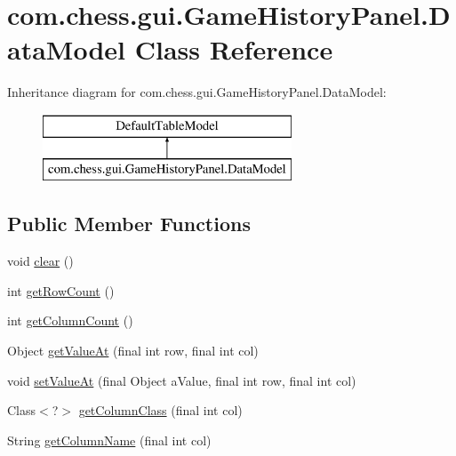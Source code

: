 \hypertarget{classcom_1_1chess_1_1gui_1_1_game_history_panel_1_1_data_model}{}\section{com.\+chess.\+gui.\+Game\+History\+Panel.\+Data\+Model Class Reference}
\label{classcom_1_1chess_1_1gui_1_1_game_history_panel_1_1_data_model}
Inheritance diagram for com.\+chess.\+gui.\+Game\+History\+Panel.\+Data\+Model\+:\begin{figure}[H]
\begin{center}
\leavevmode
\includegraphics[height=2.000000cm]{classcom_1_1chess_1_1gui_1_1_game_history_panel_1_1_data_model}
\end{center}
\end{figure}
\subsection*{Public Member Functions}
\begin{DoxyCompactItemize}
\item 
void \mbox{\hyperlink{classcom_1_1chess_1_1gui_1_1_game_history_panel_1_1_data_model_a0a5d340a3676ce28b6bd47328819e237}{clear}} ()
\item 
int \mbox{\hyperlink{classcom_1_1chess_1_1gui_1_1_game_history_panel_1_1_data_model_aef3c9c2d3e2e4937597665855ee927aa}{get\+Row\+Count}} ()
\item 
int \mbox{\hyperlink{classcom_1_1chess_1_1gui_1_1_game_history_panel_1_1_data_model_a73eb8eabe35891858fea1e6d5aeeaf81}{get\+Column\+Count}} ()
\item 
Object \mbox{\hyperlink{classcom_1_1chess_1_1gui_1_1_game_history_panel_1_1_data_model_a32d5e4b1e8afb0ad7d55650b27b4524d}{get\+Value\+At}} (final int row, final int col)
\item 
void \mbox{\hyperlink{classcom_1_1chess_1_1gui_1_1_game_history_panel_1_1_data_model_a8280ab4c921fb8d1534fde3fac479e2f}{set\+Value\+At}} (final Object a\+Value, final int row, final int col)
\item 
Class$<$?$>$ \mbox{\hyperlink{classcom_1_1chess_1_1gui_1_1_game_history_panel_1_1_data_model_a7522f9d375cf880ea1186a9eda5e89e8}{get\+Column\+Class}} (final int col)
\item 
String \mbox{\hyperlink{classcom_1_1chess_1_1gui_1_1_game_history_panel_1_1_data_model_a9d15df6fb3694f5bb4a67185cca3ee30}{get\+Column\+Name}} (final int col)
\end{DoxyCompactItemize}
